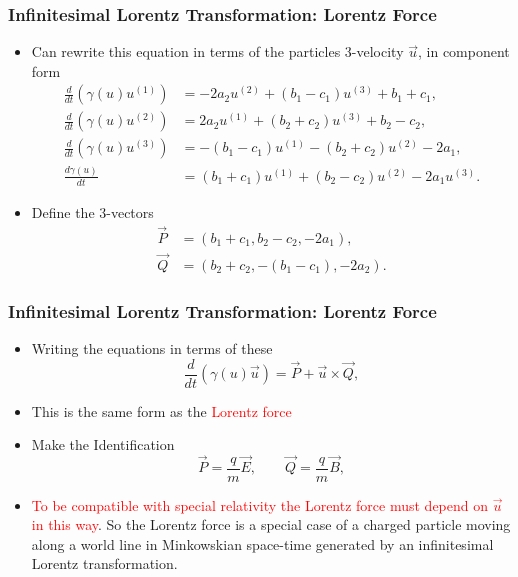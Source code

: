 \documentclass[10pt,a4paper]{beamer}
\begin{document}
\begin{frame}
\frametitle{Infinitesimal Lorentz Transformation: Lorentz Force}
\begin{itemize}
\item<1->{Can rewrite this equation in terms of the particles $3$-velocity $\vec{u}$, in component form
\begin{align*}
\frac{d}{dt} (\gamma(u) u^{(1)}) & = -2a_2u^{(2)} + (b_1 - c_1)u^{(3)} + b_1 + c_1, \\ 
\frac{d}{dt} (\gamma(u) u^{(2)}) & = 2a_2 u^{(1)} + (b_2 + c_2) u^{(3)} + b_2 - c_2,\\ 
\frac{d}{dt} (\gamma(u) u^{(3)}) & = -(b_1 - c_1) u^{(1)} - (b_2 + c_2 )u^{(2)} - 2a_1,\\ 
\frac{d\gamma(u)}{dt} & = (b_1 + c_1)u^{(1)} + (b_2 - c_2) u^{(2)} - 2a_1 u^{(3)}.
\end{align*}}
\item<2->{Define the $3$-vectors
\begin{align*}
\vec{P} & = (b_1+c_1,b_2-c_2,-2a_1), \\
\vec{Q} & = (b_2 + c_2, -(b_1 - c_1),-2a_2).
\end{align*}}

\end{itemize}

\end{frame}

\begin{frame}
\frametitle{Infinitesimal Lorentz Transformation: Lorentz Force}
\begin{itemize}
\item<1->{Writing the equations in terms of these 
\begin{equation*}
\frac{d}{dt} (\gamma(u)\vec{u}) = \vec{P} + \vec{u} \times \vec{Q},
\end{equation*}}
\item<2->{This is the same form as the \textcolor{red}{Lorentz force}}
\item<3->{Make the Identification
\begin{equation}
\vec{P} = \frac{q}{m} \vec{E}, \qquad \vec{Q} = \frac{q}{m}\vec{B},
\end{equation}}
\item<4->{\textcolor{red}{To be compatible with special relativity the Lorentz force must depend on $\vec{u}$ in this way}. So the Lorentz force is a special case of a charged particle moving along a world line in Minkowskian space-time generated by an infinitesimal Lorentz transformation.}
\end{itemize}

\end{frame}
\end{document}
